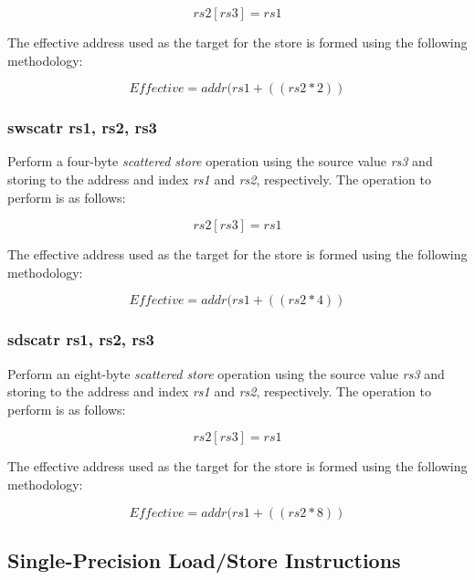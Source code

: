 \documentclass{article}
\begin{document}
\begin{equation}
rs2[rs3] = rs1
\end{equation}

The effective address used as the target
for the store is formed using the following methodology:

\begin{equation}
Effective = addr(rs1 + ((rs2 * 2))
\end{equation}

\subsubsection{swscatr rs1, rs2, rs3}

Perform a four-byte \emph{scattered store} operation using the 
source value \emph{rs3} and storing to the address and index
\emph{rs1} and \emph{rs2}, respectively.  The operation to
perform is as follows: 

\begin{equation}
rs2[rs3] = rs1
\end{equation}

The effective address used as the target
for the store is formed using the following methodology:

\begin{equation}
Effective = addr(rs1 + ((rs2 * 4))
\end{equation}

\subsubsection{sdscatr rs1, rs2, rs3}

Perform an eight-byte \emph{scattered store} operation using the 
source value \emph{rs3} and storing to the address and index
\emph{rs1} and \emph{rs2}, respectively.  The operation to
perform is as follows: 

\begin{equation}
rs2[rs3] = rs1
\end{equation}

The effective address used as the target
for the store is formed using the following methodology:

\begin{equation}
Effective = addr(rs1 + ((rs2 * 8))
\end{equation}


\subsection{Single-Precision Load/Store Instructions}
\end{document}

